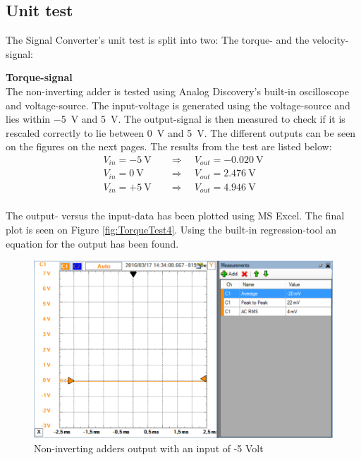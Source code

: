 \subsection{Unit test}
The Signal Converter's unit test is split into two: The torque- and the velocity-signal:

\textbf{Torque-signal}\\
The non-inverting adder is tested using Analog Discovery's built-in oscilloscope and voltage-source. The input-voltage is generated using the voltage-source and lies within \SI{-5}{\volt} and \SI{+5}{\volt}. The output-signal is then measured to check if it is rescaled correctly to lie between \SI{0}{\volt} and \SI{+5}{\volt}. The different outputs can be seen on the figures on the next pages. The results from the test are listed below:
\begin{equation}
	\begin{split}
		V_{in} = -\SI{5}{\volt} \quad &\Rightarrow \quad V_{out} = \SI{-0.020}{\volt}\\
		V_{in} = \SI{0}{\volt} \quad &\Rightarrow \quad V_{out} = \SI{2.476}{\volt}\\
		V_{in} = +\SI{5}{\volt} \quad &\Rightarrow \quad V_{out} = \SI{4.946}{\volt}\\
	\end{split}
\end{equation}

The output- versus the input-data has been plotted using MS Excel. The final plot is seen on Figure \vref{fig:TorqueTest4}. Using the built-in regression-tool an equation for the output has been found.

\begin{figure}[H]
	\centering
	\includegraphics[width=0.9\linewidth]{Hardware/SignalConverter/Torque_test1}
	\caption{Non-inverting adders output with an input of -5 Volt}
	\label{fig:TorqueTest1}
\end{figure}

